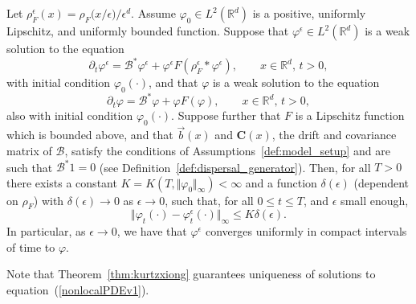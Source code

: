 \documentclass[EJP]{ejpecp} %
\newcommand{\IR}{\mathbb R}
\newcommand{\DG}{\mathcal{B}}  %
\newcommand{\meanq}{\vec b}    %
\newcommand{\covq}{\mathbf{C}}     %
\begin{document}
\begin{proposition}
    \label{prop:nonlocal_to_local}
Let $\rho^\epsilon_F(x)=\rho_F\big(x/\epsilon)/\epsilon^d$.
Assume $\varphi_0\in L^2(\IR^d)$ is a positive, uniformly Lipschitz, and uniformly bounded function. 
Suppose that $\varphi^\epsilon\in L^2(\IR^d)$ is a weak solution to the equation
\begin{equation}
\label{nonlocalPDEv1} 
\partial_t \varphi^\epsilon = \DG^* \varphi^\epsilon + 
\varphi^\epsilon F(\rho_F^\epsilon*\varphi^\epsilon),  
\qquad x \in \mathbb{R}^d,\, t >0, %
\end{equation}
with initial condition $\varphi_0(\cdot)$,
and that $\varphi$ is a weak solution to the equation
 \begin{equation}
\label{localPDE} 
\partial_t \varphi = \DG^* \varphi + \varphi F(\varphi),  
\qquad x \in \mathbb{R}^d,\, t >0, %
\end{equation}
also with initial condition $\varphi_0(\cdot)$.
Suppose further that $F$ is a Lipschitz function which is bounded above,
and that $\meanq(x)$ and $\covq(x)$, the drift and covariance matrix of $\DG$,
satisfy the conditions of Assumptions~\ref{def:model_setup}
and are such that $\DG^* 1 = 0$ (see Definition~\ref{def:dispersal_generator}).
Then, for all $T>0$ there exists a constant $K=K(T, \Vert \varphi_0 \Vert_\infty) < \infty$
and a function $\delta(\epsilon)$ (dependent on $\rho_F$) with $\delta(\epsilon)\to 0$ 
as $\epsilon\to 0$,
such that, for all $0 \leq t \leq T$, and $\epsilon$ small enough,
\[ 
\Vert \varphi_t(\cdot) - \varphi_t^\epsilon(\cdot) \Vert_\infty\leq K\delta(\epsilon). 
\]
In particular, as $\epsilon\to 0$, we have that $\varphi^\epsilon$ converges 
uniformly in compact intervals of time to $\varphi$.
\end{proposition}

\begin{remark}
Note that Theorem~\ref{thm:kurtzxiong} guarantees uniqueness of solutions
to equation~(\ref{nonlocalPDEv1}). 
\end{remark}
\end{document}
